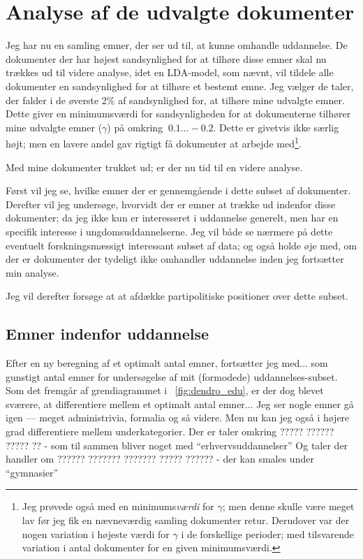 \chapter{Analyse af de udvalgte dokumenter}
Jeg har nu en samling emner, der ser ud til, at kunne omhandle uddannelse.
De dokumenter der har højest sandsynlighed for at tilhøre disse emner skal nu trækkes ud til videre analyse, idet en LDA-model, som nævnt, vil tildele alle dokumenter en sandsynlighed for at tilhøre et bestemt emne.
Jeg vælger de taler, der falder i de øverste 2\%  af sandsynlighed for, at tilhøre mine udvalgte emner.
Dette giver en minimumsværdi for sandsynligheden for at dokumenterne tilhører mine udvalgte emner ($\gamma$) på omkring $~0.1\ldots-0.2$.
Dette er givetvis ikke særlig højt; men en lavere andel gav rigtigt få dokumenter at arbejde med\footnote{Jeg prøvede også med en minimums\textit{værdi} for $\gamma$; men denne skulle være meget lav før jeg fik en nævneværdig samling dokumenter retur. Derudover var der nogen variation i højeste værdi for $\gamma$ i de forskellige perioder; med tilsvarende variation i antal dokumenter for en given minimumsværdi.}.

Med mine dokumenter trukket ud; er der nu tid til en videre analyse.

Først vil jeg se, hvilke emner der er gennemgående i dette subset af dokumenter.
Derefter vil jeg undersøge, hvorvidt der er emner at trække ud indenfor disse dokumenter; da jeg ikke kun er interesseret i uddannelse generelt, men har en specifik interesse i ungdomsuddannelserne.
Jeg vil både se nærmere på dette eventuelt forskningsmæssigt interessant subset af data; og også holde øje med, om der er dokumenter der tydeligt ikke omhandler uddannelse inden jeg fortsætter min analyse.

Jeg vil derefter forsøge at at afdække partipolitiske positioner over dette subset.

\section{Emner indenfor uddannelse}

Efter en ny beregning af et optimalt antal emner, fortsætter jeg med... som gunstigt antal emner for undersøgelse af mit (formodede) uddannelses-subset.
Som det fremgår af grendiagrammet i ~\ref{fig:dendro_edu}, er der dog blevet sværere, at differentiere mellem et optimalt antal emner...
Jeg ser nogle emner gå igen — meget administrivia, formalia og så videre.
Men nu kan jeg også i højere grad differentiere mellem underkategorier.
Der er taler omkring ????? ?????? ????? ??  - som til sammen bliver noget med “erhvervsuddannelser”
Og taler der handler om ?????? ??????? ??????? ????? ?????? - der kan smales under “gymnasier”

